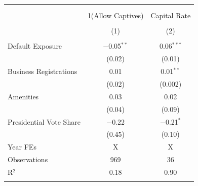 
\begin{tabular}{@{\extracolsep{5pt}}lcc} 
\\[-1.8ex]\hline 
\hline \\[-1.8ex] 
\\[-1.8ex] & 1(Allow Captives) & Capital Rate \\ 
\\[-1.8ex] & (1) & (2)\\ 
\hline \\[-1.8ex] 
 Default Exposure & $-$0.05$^{**}$ & 0.06$^{***}$ \\ 
  & (0.02) & (0.01) \\ 
  Business Registrations & 0.01 & 0.01$^{**}$ \\ 
  & (0.02) & (0.002) \\ 
  Amenities & 0.03 & 0.02 \\ 
  & (0.04) & (0.09) \\ 
  Presidential Vote Share & $-$0.22 & $-$0.21$^{*}$ \\ 
  & (0.45) & (0.10) \\ 
 Year FEs & X & X \\ 
Observations & 969 & 36 \\ 
R$^{2}$ & 0.18 & 0.90 \\ 
\hline \\[-1.8ex] 
\end{tabular} 
